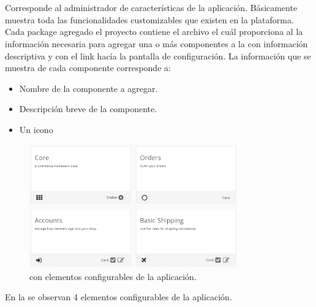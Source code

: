 \section{\dashboardEF}
	Corresponde al administrador de características de la aplicación. Básicamente muestra toda las funcionalidades customizables que existen en la plataforma.
	Cada package agregado el proyecto contiene el archivo \packageDescriptionFILE el cuál proporciona al \dashboardEF la información necesaria para agregar una o más componentes a la \uiSiglaAS con información descriptiva y con el link hacía la pantalla de configuración.
	La información que se muestra de cada componente corresponde a:

	\begin{itemize}
		\item Nombre de la componente a agregar.
		\item Descripción breve de la componente.
		\item Un icono 
	\end{itemize} 


	\begin{figure}[!h]
		\centering
		\includegraphics[width=0.8\textwidth]{figuras/dashboard/dashboard_menu.png}
		\caption{\dashboardEF con elementos configurables de la aplicación.}
		\label{figure:dashboard:dashboard_menu}
	\end{figure}

	En la  se observan 4 elementos configurables de la aplicación. 

	

	

	

	

	